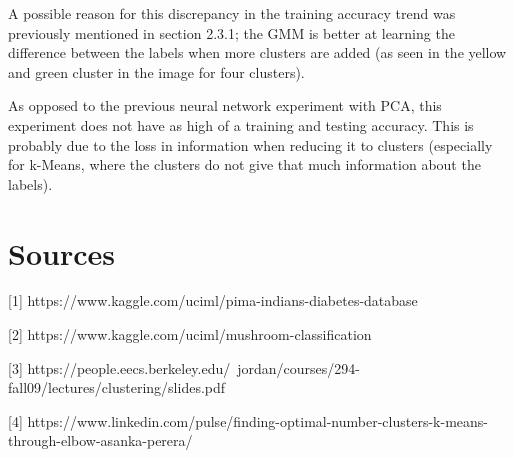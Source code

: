 \documentclass[11pt]{article}
\begin{document}
            A possible reason for this discrepancy in the training accuracy trend was previously
            mentioned in section 2.3.1; the GMM is better at learning the difference between the labels
            when more clusters are added (as seen in the yellow and green cluster in the image
            for four clusters).

            As opposed to the previous neural network experiment with PCA, this experiment
            does not have as high of a training and testing accuracy. This is probably due to
            the loss in information when reducing it to clusters (especially for k-Means,
            where the clusters do not give that much information about the labels).



        \section{Sources}

        [1] https://www.kaggle.com/uciml/pima-indians-diabetes-database

        [2] https://www.kaggle.com/uciml/mushroom-classification

        [3] https://people.eecs.berkeley.edu/~jordan/courses/294-fall09/lectures/clustering/slides.pdf

        [4] https://www.linkedin.com/pulse/finding-optimal-number-clusters-k-means-through-elbow-asanka-perera/

    
\end{document}
